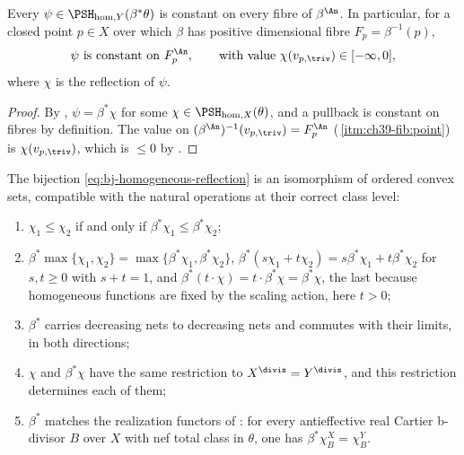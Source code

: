 \begin{corollary}
\label{cor:ch39-fibre-constant}
Every $\psi\in\PSH_{\mathrm{hom},Y}(\beta^*\theta)$ is constant on every
fibre of $\beta^{\An}$.  In particular, for a closed point $p\in X$ over
which $\beta$ has positive dimensional fibre $F_p=\beta^{-1}(p)$,
\[
 \psi\ \text{is constant on}\ F_p^{\An},
 \qquad\text{with value}\ \chi(v_{p,\triv})\in[-\infty,0],
\]
where $\chi$ is the reflection of $\psi$.
\end{corollary}

\begin{proof}
By , $\psi=\beta^*\chi$ for some
$\chi\in\PSH_{\mathrm{hom},X}(\theta)$, and a pullback is constant on
fibres by definition.  The value on
$(\beta^{\An})^{-1}(v_{p,\triv})=F_p^{\An}$
(\,\cref{itm:ch39-fib:point}) is
$\chi(v_{p,\triv})$, which is $\le0$ by
.
\end{proof}

\begin{corollary}
\label{cor:ch39-hom-structure}
The bijection \eqref{eq:bj-homogeneous-reflection} is an isomorphism of
ordered convex sets, compatible with the natural operations at their correct
class level:
\begin{enumerate}
\item\label{itm:ch39-hs:order} $\chi_1\le\chi_2$ if and only if
 $\beta^*\chi_1\le\beta^*\chi_2$;
\item\label{itm:ch39-hs:ops} $\beta^*\max\{\chi_1,\chi_2\}
 =\max\{\beta^*\chi_1,\beta^*\chi_2\}$,
 $\beta^*(s\chi_1+t\chi_2)=s\beta^*\chi_1+t\beta^*\chi_2$ for
 $s,t\ge0$ with $s+t=1$, and
 $\beta^*(t\cdot\chi)=t\cdot\beta^*\chi=\beta^*\chi$, the last because
 homogeneous functions are fixed by the scaling action, here $t>0$;
\item\label{itm:ch39-hs:limits} $\beta^*$ carries decreasing nets to
 decreasing nets and commutes with their limits, in both directions;
\item\label{itm:ch39-hs:trace} $\chi$ and $\beta^*\chi$ have the same
 restriction to $X^{\divis}=Y^{\divis}$, and this restriction determines
 each of them;
\item\label{itm:ch39-hs:bdiv} $\beta^*$ matches the realization functors
 of : for every antieffective real
 Cartier b-divisor $B$ over $X$ with nef total class in $\theta$, one
 has $\beta^*\chi^X_B=\chi^Y_B$.
\end{enumerate}
\end{corollary}

